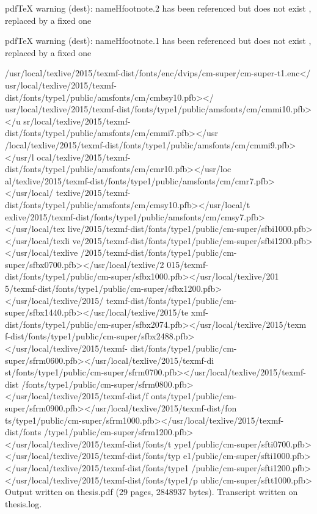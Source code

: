 pdfTeX warning (dest): name{Hfootnote.2} has been referenced but does not exist
, replaced by a fixed one

pdfTeX warning (dest): name{Hfootnote.1} has been referenced but does not exist
, replaced by a fixed one

{/usr/local/texlive/2015/texmf-dist/fonts/enc/dvips/cm-super/cm-super-t1.enc}</
usr/local/texlive/2015/texmf-dist/fonts/type1/public/amsfonts/cm/cmbsy10.pfb></
usr/local/texlive/2015/texmf-dist/fonts/type1/public/amsfonts/cm/cmmi10.pfb></u
sr/local/texlive/2015/texmf-dist/fonts/type1/public/amsfonts/cm/cmmi7.pfb></usr
/local/texlive/2015/texmf-dist/fonts/type1/public/amsfonts/cm/cmmi9.pfb></usr/l
ocal/texlive/2015/texmf-dist/fonts/type1/public/amsfonts/cm/cmr10.pfb></usr/loc
al/texlive/2015/texmf-dist/fonts/type1/public/amsfonts/cm/cmr7.pfb></usr/local/
texlive/2015/texmf-dist/fonts/type1/public/amsfonts/cm/cmsy10.pfb></usr/local/t
exlive/2015/texmf-dist/fonts/type1/public/amsfonts/cm/cmsy7.pfb></usr/local/tex
live/2015/texmf-dist/fonts/type1/public/cm-super/sfbi1000.pfb></usr/local/texli
ve/2015/texmf-dist/fonts/type1/public/cm-super/sfbi1200.pfb></usr/local/texlive
/2015/texmf-dist/fonts/type1/public/cm-super/sfbx0700.pfb></usr/local/texlive/2
015/texmf-dist/fonts/type1/public/cm-super/sfbx1000.pfb></usr/local/texlive/201
5/texmf-dist/fonts/type1/public/cm-super/sfbx1200.pfb></usr/local/texlive/2015/
texmf-dist/fonts/type1/public/cm-super/sfbx1440.pfb></usr/local/texlive/2015/te
xmf-dist/fonts/type1/public/cm-super/sfbx2074.pfb></usr/local/texlive/2015/texm
f-dist/fonts/type1/public/cm-super/sfbx2488.pfb></usr/local/texlive/2015/texmf-
dist/fonts/type1/public/cm-super/sfrm0600.pfb></usr/local/texlive/2015/texmf-di
st/fonts/type1/public/cm-super/sfrm0700.pfb></usr/local/texlive/2015/texmf-dist
/fonts/type1/public/cm-super/sfrm0800.pfb></usr/local/texlive/2015/texmf-dist/f
onts/type1/public/cm-super/sfrm0900.pfb></usr/local/texlive/2015/texmf-dist/fon
ts/type1/public/cm-super/sfrm1000.pfb></usr/local/texlive/2015/texmf-dist/fonts
/type1/public/cm-super/sfrm1200.pfb></usr/local/texlive/2015/texmf-dist/fonts/t
ype1/public/cm-super/sfti0700.pfb></usr/local/texlive/2015/texmf-dist/fonts/typ
e1/public/cm-super/sfti1000.pfb></usr/local/texlive/2015/texmf-dist/fonts/type1
/public/cm-super/sfti1200.pfb></usr/local/texlive/2015/texmf-dist/fonts/type1/p
ublic/cm-super/sftt1000.pfb>
Output written on thesis.pdf (29 pages, 2848937 bytes).
Transcript written on thesis.log.
